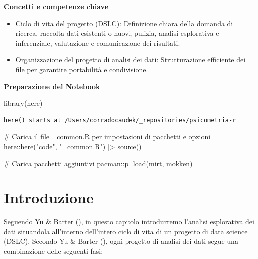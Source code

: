 \documentclass[
  letterpaper,
  DIV=11,
  numbers=noendperiod]{scrreprt}
\newenvironment{Shaded}{\begin{snugshade}}{\end{snugshade}}
\newcommand{\CommentTok}[1]{\textcolor[rgb]{0.37,0.37,0.37}{#1}}
\newcommand{\FunctionTok}[1]{\textcolor[rgb]{0.28,0.35,0.67}{#1}}
\newcommand{\NormalTok}[1]{\textcolor[rgb]{0.00,0.23,0.31}{#1}}
\newcommand{\SpecialCharTok}[1]{\textcolor[rgb]{0.37,0.37,0.37}{#1}}
\newcommand{\StringTok}[1]{\textcolor[rgb]{0.13,0.47,0.30}{#1}}
\providecommand{\tightlist}{%
  \setlength{\itemsep}{0pt}\setlength{\parskip}{0pt}}\usepackage{longtable,booktabs,array}
\theoremstyle{definition}
\theoremstyle{remark}
\begin{document}
\textbf{Concetti e competenze chiave}

\begin{itemize}
\tightlist
\item
  Ciclo di vita del progetto (DSLC): Definizione chiara della domanda di
  ricerca, raccolta dati esistenti o nuovi, pulizia, analisi esplorativa
  e inferenziale, valutazione e comunicazione dei risultati.
\item
  Organizzazione del progetto di analisi dei dati: Strutturazione
  efficiente dei file per garantire portabilità e condivisione.
\end{itemize}

\textbf{Preparazione del Notebook}

\begin{Shaded}
\begin{Highlighting}[]
\FunctionTok{library}\NormalTok{(here)}
\end{Highlighting}
\end{Shaded}

\begin{verbatim}
here() starts at /Users/corradocaudek/_repositories/psicometria-r
\end{verbatim}

\begin{Shaded}
\begin{Highlighting}[]
\CommentTok{\# Carica il file \_common.R per impostazioni di pacchetti e opzioni}
\NormalTok{here}\SpecialCharTok{::}\FunctionTok{here}\NormalTok{(}\StringTok{"code"}\NormalTok{, }\StringTok{"\_common.R"}\NormalTok{) }\SpecialCharTok{|\textgreater{}} \FunctionTok{source}\NormalTok{()}

\CommentTok{\# Carica pacchetti aggiuntivi}
\NormalTok{pacman}\SpecialCharTok{::}\FunctionTok{p\_load}\NormalTok{(mirt, mokken)}
\end{Highlighting}
\end{Shaded}

\section{Introduzione}\label{introduzione-6}

Seguendo Yu \& Barter (), in questo
capitolo introdurremo l'analisi esplorativa dei dati situandola
all'interno dell'intero ciclo di vita di un progetto di data science
(DSLC). Secondo Yu \& Barter (),
ogni progetto di analisi dei dati segue una combinazione delle seguenti
fasi:
\end{document}
